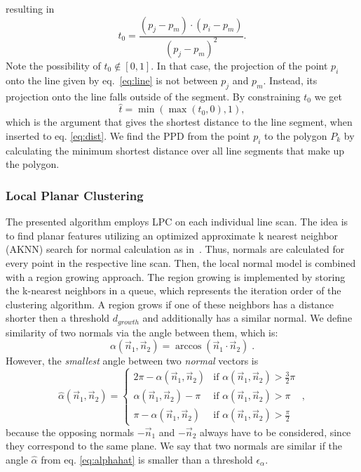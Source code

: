 resulting in 
\begin{equation}
	t_0 = \frac{\left( p_j - p_m \right) \cdot \left( p_i - p_m \right)}{\left( p_j - p_m \right)^2} .
\end{equation}
Note the possibility of $t_0 \notin \left[ 0, 1 \right]$. 
In that case, the projection of the point $p_i$ onto the line given by eq.~\ref{eq:line} is not between $p_j$ and $p_m$. 
Instead, its projection onto the line falls outside of the segment.
By constraining $t_0$ we get 
\begin{equation}
\label{eq:minmax}
	\hat t = \min \left( \max \left( t_0, 0\right) , 1 \right) ,
\end{equation}
which is the argument that gives the shortest distance to the line segment, when inserted to eq. \ref{eq:dist}.
We find the PPD from the point $p_i$ to the polygon $P_k$ by calculating the minimum shortest distance over all line segments that make up the polygon.  

\subsubsection{Local Planar Clustering}

The presented algorithm employs LPC on each individual line scan.
The idea is to find planar features utilizing an optimized approximate k nearest neighbor (AKNN) search for normal calculation as in~\cite{aknnbbs}.
Thus, normals are calculated for every point in the respective line scan.
Then, the local normal model is combined with a region growing approach.
The region growing is implemented by storing the k-nearest neighbors in a queue, which represents the iteration order of the clustering algorithm.
A region grows if one of these neighbors has a distance shorter then a threshold $d_{growth}$ and additionally has a similar normal.
We define similarity of two normals via the angle between them, which is:
\begin{equation}
\label{eq:smallestalpha}
	\alpha(\vec{n}_1, \vec{n}_2) = \arccos(\vec{n}_1 \cdot \vec{n}_2) \; .
\end{equation}
However, the \textit{smallest} angle between two \textit{normal} vectors is 
\begin{equation}
\label{eq:alphahat}
\hat \alpha(\vec{n}_1, \vec{n}_2) = 
\begin{cases}
	2\pi - \alpha(\vec{n}_1, \vec{n}_2) & \text{if  } \alpha(\vec{n}_1, \vec{n}_2) > \frac{3}{2} \pi \\
	\alpha(\vec{n}_1, \vec{n}_2) - \pi & \text{if  } \alpha(\vec{n}_1, \vec{n}_2) > \pi \\
	\pi - \alpha(\vec{n}_1, \vec{n}_2) & \text{if  } \alpha(\vec{n}_1, \vec{n}_2) > \frac{\pi}{2} 
\end{cases}
\; ,
\end{equation}
because the opposing normals $-\vec{n}_1$ and $-\vec{n}_2$ always have to be considered, since they correspond to the same plane.
We say that two normals are similar if the angle $\hat \alpha$ from eq. \ref{eq:alphahat} is smaller than a threshold $\epsilon_{\alpha}$. 

